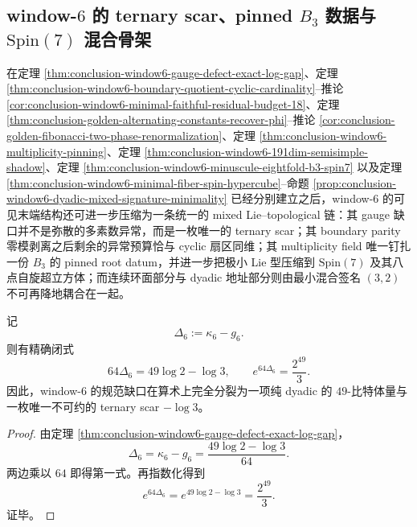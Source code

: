 \subsection{window-\texorpdfstring{$6$}{6} 的 ternary scar、pinned \texorpdfstring{$B_3$}{B3} 数据与 \texorpdfstring{$\mathrm{Spin}(7)$}{Spin(7)} 混合骨架}\label{subsec:conclusion-window6-ternary-scar-pinned-b3-spin7-mixed-object}

在定理 \ref{thm:conclusion-window6-gauge-defect-exact-log-gap}、定理 \ref{thm:conclusion-window6-boundary-quotient-cyclic-cardinality}--推论 \ref{cor:conclusion-window6-minimal-faithful-residual-budget-18}、定理 \ref{thm:conclusion-golden-alternating-constants-recover-phi}--推论 \ref{cor:conclusion-golden-fibonacci-two-phase-renormalization}、定理 \ref{thm:conclusion-window6-multiplicity-pinning}、定理 \ref{thm:conclusion-window6-191dim-semisimple-shadow}、定理 \ref{thm:conclusion-window6-minuscule-eightfold-b3-spin7} 以及定理 \ref{thm:conclusion-window6-minimal-fiber-spin-hypercube}--命题 \ref{prop:conclusion-window6-dyadic-mixed-signature-minimality} 已经分别建立之后，window-\(6\) 的可见末端结构还可进一步压缩为一条统一的 mixed Lie--topological 链：其 gauge 缺口并不是弥散的多素数异常，而是一枚唯一的 ternary scar；其 boundary parity 零模剥离之后剩余的异常预算恰与 cyclic 扇区同维；其 multiplicity field 唯一钉扎一份 \(B_3\) 的 pinned root datum，并进一步把极小 Lie 型压缩到 \(\mathrm{Spin}(7)\) 及其八点自旋超立方体；而连续环面部分与 dyadic 地址部分则由最小混合签名 \((3,2)\) 不可再降地耦合在一起。

\begin{theorem}\label{thm:conclusion-window6-gauge-gap-unique-ternary-scar}
记
\[
\Delta_6:=\kappa_6-g_6.
\]
则有精确闭式
\[
64\Delta_6=49\log 2-\log 3,
\qquad
e^{64\Delta_6}=\frac{2^{49}}{3}.
\]
因此，window-\(6\) 的规范缺口在算术上完全分裂为一项纯 dyadic 的 \(49\)-比特体量与一枚唯一不可约的 ternary scar \(-\log 3\)。
\end{theorem}
\begin{proof}
由定理 \ref{thm:conclusion-window6-gauge-defect-exact-log-gap}，
\[
\Delta_6=\kappa_6-g_6=\frac{49\log 2-\log 3}{64}.
\]
两边乘以 \(64\) 即得第一式。再指数化得到
\[
e^{64\Delta_6}=e^{49\log 2-\log 3}=\frac{2^{49}}{3}.
\]
证毕。
\end{proof}

